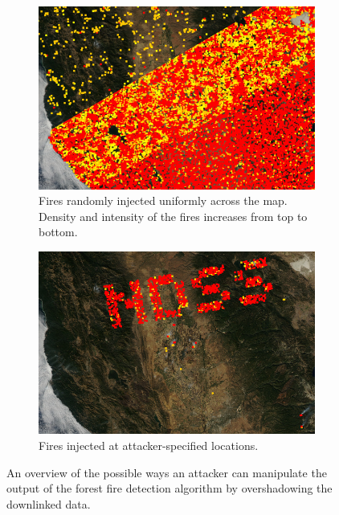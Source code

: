 \begin{figure}
\begin{subfigure}{0.49\textwidth}
        \includegraphics[width=\textwidth]{diagrams/injection/random_combined_diagonal.jpg}
        \caption{Fires randomly injected uniformly across the map. Density and intensity of the fires increases from top to bottom.}
        \label{fig:injection-random}
    \end{subfigure}
    \begin{subfigure}{0.49\textwidth}
        \centering
        \includegraphics[width=\textwidth]{diagrams/injection/pixels_800_140.jpg}
        \caption{Fires injected at attacker-specified locations.\newline}
        \label{fig:injection-logo}
    \end{subfigure}
    \caption{An overview of the possible ways an attacker can manipulate the output of the forest fire detection algorithm by overshadowing the downlinked data.}
    \label{fig:injection}
\end{figure}

